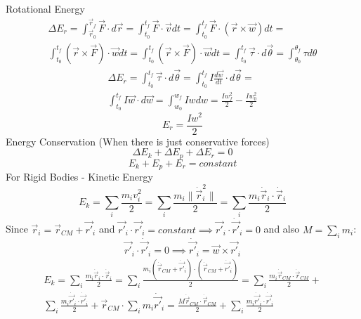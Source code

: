 \documentclass{article}
\begin{document}
Rotational Energy
\begin{equation}
  \begin{split}
    \Delta E_r = \int_{\vec{r}_0}^{\vec{r}_f}\vec{F} \cdot d\vec{r} = \int_{t_0}^{t_f}\vec{F} \cdot \vec{v}dt =   \int_{t_0}^{t_f} \vec{F} \cdot (\vec{r} \times \vec{w})dt = \\ \int_{t_0}^{t_f}(\vec{r} \times \vec{F}) \cdot \vec{w}dt = \int_{t_0}^{t_f} (\vec{r} \times \vec{F}) \cdot \vec{w}dt =  \int_{t_0}^{t_f} \vec{\tau}\cdot d\vec{\theta} = \int_{\theta_0}^{\theta_f}\tau d\theta
  \end{split}
\end{equation}
\begin{equation}
  \begin{split}
    \Delta E_r = \int_{t_0}^{t_f} \vec{\tau}\cdot d\vec{\theta} =  \int_{t_0}^{t_f} I\frac{d\vec{w}}{dt}\cdot d\vec{\theta} =\\  \int_{t_0}^{t_f} I \vec{w} \cdot d\vec{w} = \int_{w_0}^{w_f} Iwdw = \frac{Iw_f^2}{2} - \frac{Iw_0^2}{2}
  \end{split}
\end{equation}
\begin{equation}
  E_r = \frac{Iw^2}{2}
\end{equation}
Energy Conservation (When there is just conservative forces)
\begin{equation}
  \Delta E_k + \Delta E_p + \Delta E_r = 0
\end{equation}
\begin{equation}
  E_k + E_p + E_r = constant
\end{equation}
For Rigid Bodies - Kinetic Energy
\begin{equation}
  E_k = \sum_i \frac{m_iv_i^2}{2} = \sum_i \frac{m_i\|\dot{\vec{r}}_i^2\|}{2} = \sum_i \frac{m_i \dot{\vec{r}}_i \cdot \dot{\vec{r}}_i }{2} 
\end{equation}
Since $\vec{r}_i = \vec{r}_{CM} + \vec{r'}_i$ and $\vec{r'}_i \cdot \vec{r'}_i = constant \implies \vec{r'}_i \cdot \dot{\vec{r'}}_i = 0$ and also $M = \sum_im_i$:
\begin{equation}
  \vec{r'}_i \cdot \dot{\vec{r'}}_i = 0 \implies \dot{\vec{r'}}_i = \vec{w} \times \vec{r'}_i
\end{equation}
\begin{equation}
  \begin{split}
    E_k = \sum_i \frac{m_i \dot{\vec{r}}_i \cdot \dot{\vec{r}}_i }{2} = \sum_i \frac{m_i (\dot{\vec{r}}_{CM} + \dot{\vec{r'}}_i) \cdot (\dot{\vec{r}}_{CM} +\dot{\vec{r'}}_i)}{2} =  \sum_i \frac{m_i \dot{\vec{r}}_{CM} \cdot \dot{\vec{r}}_{CM}}{2} + \\\sum_i \frac{m_i \dot{\vec{r'}}_i \cdot \dot{\vec{r'}}_i}{2} + \vec{r}_{CM} \cdot \sum_i m_i \dot{\vec{r'}}_i =  \frac{M\dot{\vec{r}}_{CM} \cdot \dot{\vec{r}}_{CM}}{2} + \sum_i \frac{m_i \dot{\vec{r'}}_i \cdot \dot{\vec{r'}}_i}{2}
  \end{split}
\end{equation}
\end{document}
